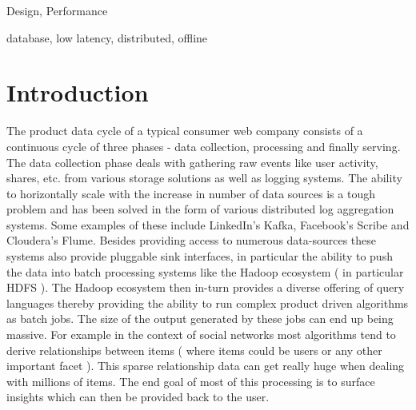 \documentclass[10pt,twocolumn,preprint,natbib,authoryear]{sigplanconf}
\begin{document}

\terms
Design, Performance

\keywords
database, low latency, distributed, offline


\section{Introduction}
\label{sec:introduction}
The product data cycle of a typical consumer web company consists of a continuous cycle of three phases - data collection, processing and finally serving. The data collection phase deals with gathering raw events like user activity, shares, etc. from various storage solutions as well as logging systems. The ability to horizontally scale with the increase in number of data sources is a tough problem and has been solved in the form of various distributed log aggregation systems. Some examples of these include LinkedIn's Kafka\cite{1}, Facebook's Scribe\cite{2} and Cloudera's Flume\cite{3}. Besides providing access to numerous data-sources these systems also provide pluggable sink interfaces, in particular the ability to push the data into batch processing systems like the Hadoop ecosystem ( in particular HDFS )\cite{4}. The Hadoop ecosystem then in-turn provides a diverse offering of query languages thereby providing the ability to run complex product driven algorithms as batch jobs. The size of the output generated by these jobs can end up being massive. For example in the context of social networks most algorithms tend to derive relationships between items ( where items could be users or any other important facet ). This sparse relationship data can get really huge when dealing with millions of items. The end goal of most of this processing is to surface insights which can then be provided back to the user.
\end{document}
